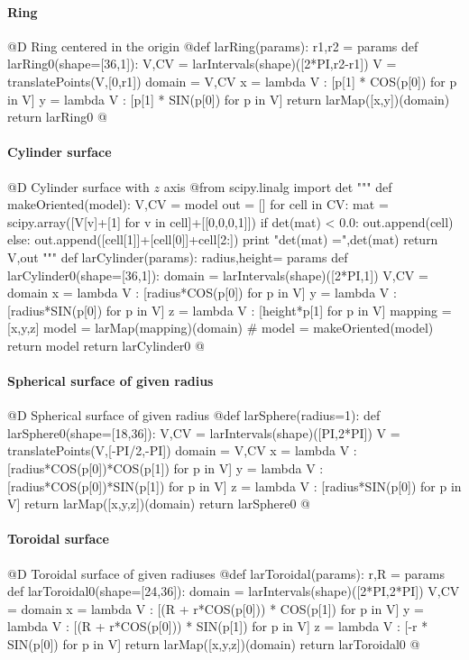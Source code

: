 \documentclass[11pt,oneside]{article}	%
\begin{document}
\paragraph{Ring}
@D Ring centered in the origin
@{def larRing(params):
	r1,r2 = params
	def larRing0(shape=[36,1]):
		V,CV = larIntervals(shape)([2*PI,r2-r1])
		V = translatePoints(V,[0,r1])
		domain = V,CV
		x = lambda V : [p[1] * COS(p[0]) for p in V]
		y = lambda V : [p[1] * SIN(p[0]) for p in V]
		return larMap([x,y])(domain)
	return larRing0
@}
\paragraph{Cylinder surface}
@D Cylinder surface with $z$ axis
@{from scipy.linalg import det
"""
def makeOriented(model):
	V,CV = model
	out = []
	for cell in CV: 
		mat = scipy.array([V[v]+[1] for v in cell]+[[0,0,0,1]])
		if det(mat) < 0.0:
			out.append(cell)
		else:
			out.append([cell[1]]+[cell[0]]+cell[2:])
		print "\n det(mat) =",det(mat)
	return V,out
"""
def larCylinder(params):
	radius,height= params
	def larCylinder0(shape=[36,1]):
		domain = larIntervals(shape)([2*PI,1])
		V,CV = domain
		x = lambda V : [radius*COS(p[0]) for p in V]
		y = lambda V : [radius*SIN(p[0]) for p in V]
		z = lambda V : [height*p[1] for p in V]
		mapping = [x,y,z]
		model = larMap(mapping)(domain)
		# model = makeOriented(model)
		return model
	return larCylinder0
@}
\paragraph{Spherical surface of given radius}
@D Spherical surface of given radius
@{def larSphere(radius=1):
	def larSphere0(shape=[18,36]):
		V,CV = larIntervals(shape)([PI,2*PI])
		V = translatePoints(V,[-PI/2,-PI])
		domain = V,CV
		x = lambda V : [radius*COS(p[0])*COS(p[1]) for p in V]
		y = lambda V : [radius*COS(p[0])*SIN(p[1]) for p in V]
		z = lambda V : [radius*SIN(p[0]) for p in V]
		return larMap([x,y,z])(domain)
	return larSphere0
@}
\paragraph{Toroidal surface}
@D Toroidal surface of given radiuses
@{def larToroidal(params):
	r,R = params
	def larToroidal0(shape=[24,36]):
		domain = larIntervals(shape)([2*PI,2*PI])
		V,CV = domain
		x = lambda V : [(R + r*COS(p[0])) * COS(p[1]) for p in V]
		y = lambda V : [(R + r*COS(p[0])) * SIN(p[1]) for p in V]
		z = lambda V : [-r * SIN(p[0]) for p in V]
		return larMap([x,y,z])(domain)
	return larToroidal0
@}
\end{document}
